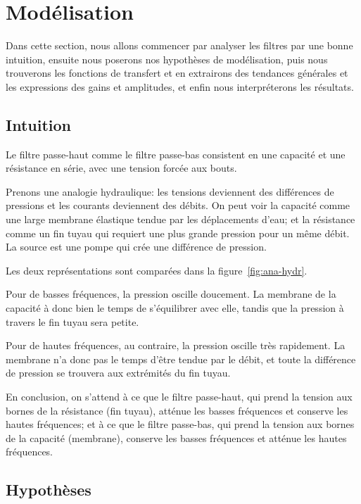 \section{Modélisation}

Dans cette section, nous allons commencer par analyser les filtres
par une bonne intuition,
ensuite nous poserons nos hypothèses de modélisation,
puis nous trouverons les fonctions de transfert et en extrairons
des tendances générales
et les expressions des gains et amplitudes,
et enfin nous interpréterons les résultats.

\subsection{Intuition}

Le filtre passe-haut comme le filtre passe-bas
consistent en une capacité et une résistance en série,
avec une tension forcée aux bouts.

Prenons une analogie hydraulique:
les tensions deviennent des différences de pressions
et les courants deviennent des débits.
On peut voir la capacité comme une large membrane élastique
tendue par les déplacements d'eau;
et la résistance comme un fin tuyau
qui requiert une plus grande pression pour un même débit.
La source est une pompe qui crée une différence de pression.

Les deux représentations sont comparées dans la figure~\ref{fig:ana-hydr}.

Pour de basses fréquences, la pression oscille doucement.
La membrane de la capacité à donc bien le temps de s'équilibrer avec elle,
tandis que la pression à travers le fin tuyau sera petite.

Pour de hautes fréquences, au contraire,
la pression oscille très rapidement.
La membrane n'a donc pas le temps d'être tendue par le débit,
et toute la différence de pression
se trouvera aux extrémités du fin tuyau.

En conclusion, on s'attend à ce que le filtre passe-haut,
qui prend la tension aux bornes de la résistance (fin tuyau),
atténue les basses fréquences et conserve les hautes fréquences;
et à ce que le filtre passe-bas,
qui prend la tension aux bornes de la capacité (membrane),
conserve les basses fréquences et atténue les hautes fréquences.


\subsection{Hypothèses}

